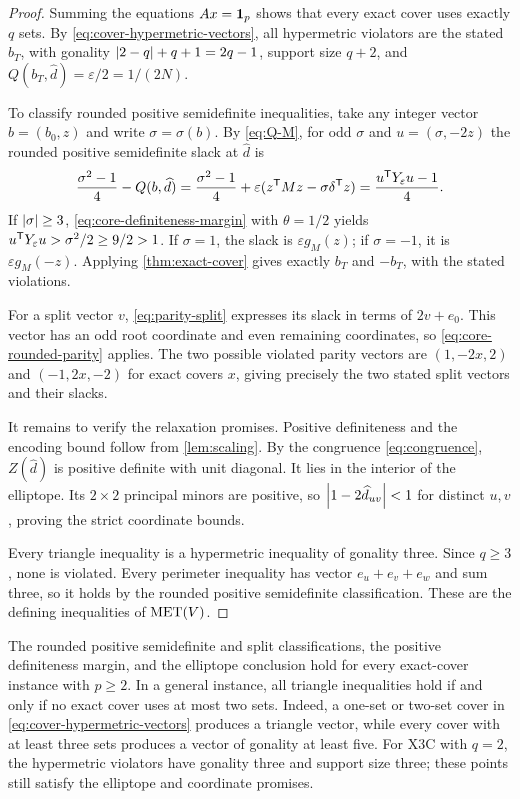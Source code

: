 \begin{proof}
Summing the equations $Ax=\mathbf 1_p$ shows that every exact cover uses
exactly $q$ sets.  By \eqref{eq:cover-hypermetric-vectors}, all
hypermetric violators are the stated $b_T$, with gonality
$\left\lvert 2-q\right\rvert+q+1=2q-1$, support size $q+2$, and
$Q(b_T,\widehat d)=\varepsilon/2=1/(2N)$.

To classify rounded positive semidefinite inequalities, take any integer
vector $b=(b_0,z)$ and write $\sigma=\sigma(b)$.  By \eqref{eq:Q-M}, for
odd $\sigma$ and $u=(\sigma,-2z)$ the rounded positive semidefinite slack at
$\widehat d$ is
\begin{equation}\label{eq:core-rounded-parity}
  \frac{\sigma^2-1}{4}-Q(b,\widehat d)
  =\frac{\sigma^2-1}{4}
    +\varepsilon(z^{\mathsf T} Mz-\sigma\delta^{\mathsf T} z)
  =\frac{u^{\mathsf T} Y_\varepsilon u-1}{4}.
\end{equation}
If $\left\lvert \sigma\right\rvert\geq3$, \eqref{eq:core-definiteness-margin} with
$\theta=1/2$ yields
$u^{\mathsf T} Y_\varepsilon u>\sigma^2/2\geq9/2>1$.
If $\sigma=1$, the slack is $\varepsilon g_M(z)$; if $\sigma=-1$,
it is $\varepsilon g_M(-z)$.  Applying \cref{thm:exact-cover} gives
exactly $b_T$ and $-b_T$, with the stated violations.

For a split vector $v$, \eqref{eq:parity-split} expresses its slack in
terms of $2v+e_0$.  This vector has an odd root coordinate and even remaining
coordinates, so \eqref{eq:core-rounded-parity} applies.  The two possible
violated parity vectors are $(1,-2x,2)$ and $(-1,2x,-2)$ for exact covers
$x$, giving precisely the two stated split vectors and their slacks.

It remains to verify the relaxation promises.  Positive definiteness
and the encoding bound follow from \cref{lem:scaling}.  By the congruence
\eqref{eq:congruence}, $Z(\widehat d)$ is positive definite with unit
diagonal.  It lies in the interior of the elliptope.  Its $2\times2$
principal minors are positive, so
$\left\lvert 1-2\widehat d_{uv}\right\rvert<1$ for distinct $u,v$, proving the strict
coordinate bounds.

Every triangle inequality is a hypermetric inequality of gonality three.
Since $q\geq3$, none is violated.  Every perimeter inequality has vector
$e_u+e_v+e_w$ and sum three, so it holds by the rounded positive
semidefinite classification.
These are the defining inequalities of $\operatorname{MET}(V)$.
\end{proof}

\begin{remark}\label{rem:small-cover-triangles}
The rounded positive semidefinite and split classifications, the positive
definiteness margin, and the elliptope conclusion hold for every exact-cover instance
with $p\geq2$.  In a general instance, all triangle inequalities hold if
and only if no exact cover uses at most two sets.  Indeed, a one-set or
two-set cover in \eqref{eq:cover-hypermetric-vectors} produces a triangle
vector, while every cover with at least three sets produces a vector of
gonality at least five.  For X3C with $q=2$, the hypermetric violators have
gonality three and support size three; these points still satisfy the
elliptope and coordinate promises.
\end{remark}

